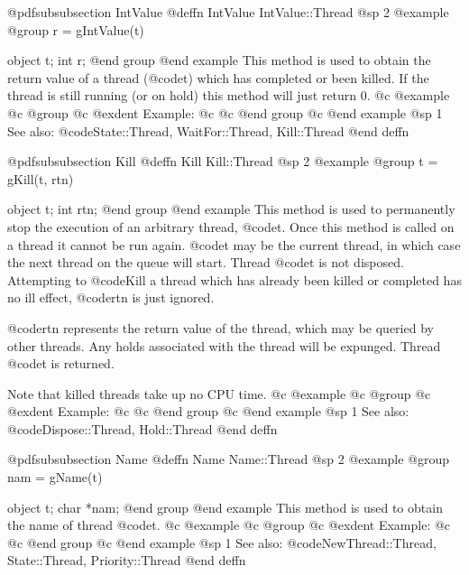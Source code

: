 @pdfsubsubsection {IntValue}
@deffn {IntValue} IntValue::Thread
@sp 2
@example
@group
r = gIntValue(t)

object  t;
int     r;
@end group
@end example
This method is used to obtain the return value of a thread (@code{t})
which has completed or been killed.  If the thread is still running
(or on hold) this method will just return 0.
@c @example
@c @group
@c @exdent Example:
@c 
@c @end group
@c @end example
@sp 1
See also:  @code{State::Thread, WaitFor::Thread, Kill::Thread}
@end deffn















@pdfsubsubsection {Kill}
@deffn {Kill} Kill::Thread
@sp 2
@example
@group
t = gKill(t, rtn)

object  t;
int     rtn;
@end group
@end example
This method is used to permanently stop the execution of an arbitrary
thread, @code{t}.  Once this method is called on a thread it cannot
be run again.  @code{t} may be the current thread, in which case the
next thread on the queue will start.  Thread @code{t} is not disposed.
Attempting to @code{Kill} a thread which has already been killed or
completed has no ill effect, @code{rtn} is just ignored.

@code{rtn} represents the return value of the thread, which may be
queried by other threads.  Any holds associated with the thread
will be expunged.  Thread @code{t} is returned.

Note that killed threads take up no CPU time.
@c @example
@c @group
@c @exdent Example:
@c 
@c @end group
@c @end example
@sp 1
See also:  @code{Dispose::Thread, Hold::Thread}
@end deffn








@pdfsubsubsection {Name}
@deffn {Name} Name::Thread
@sp 2
@example
@group
nam = gName(t)

object  t;
char    *nam;
@end group
@end example
This method is used to obtain the name of thread @code{t}.
@c @example
@c @group
@c @exdent Example:
@c 
@c @end group
@c @end example
@sp 1
See also:  @code{NewThread::Thread, State::Thread, Priority::Thread}
@end deffn












